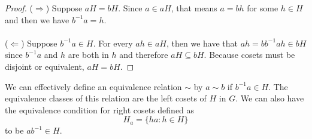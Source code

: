 \documentclass{article}
\theoremstyle{definition}
\begin{document}
\begin{proof}
    ($\Rightarrow$) Suppose $aH = bH$. Since $a \in aH$, that means $a=bh$ for some $h\in H$ and then we have $b^{-1}a=h$. \\\\
    ($\Leftarrow$) Suppose $b^{-1}a\in H$. For every $ah \in aH$, then we have that $ah = bb^{-1}ah \in bH$ since $b^{-1}a$ and $h$ are both in $h$ and therefore $aH \subseteq bH$. Because cosets must be disjoint or equivalent, $aH=bH$.
\end{proof}
We can effectively define an equivalence relation $\sim$ by $a\sim b$ if $b^{-1}a \in H$. The equivalence classes of this relation are the left cosets of $H$ in $G$. We can also have the equivalence condition for right cosets defined as 
\begin{equation*}
    H_a = \{ ha : h \in H\}
\end{equation*}
to be $ab^{-1} \in H$. 
\end{document}
